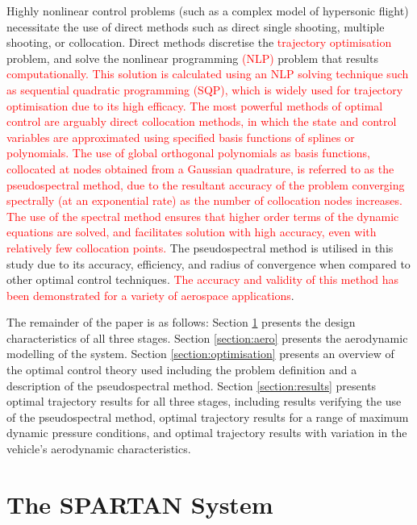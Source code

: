 \documentclass[journal]{new-aiaa}
\begin{document}
Highly nonlinear control problems (such as a complex model of hypersonic flight) necessitate the use of direct methods such as direct single shooting, multiple shooting, or collocation\cite{Rao2009}.
Direct methods discretise the \textcolor{red}{trajectory optimisation }problem, and solve the nonlinear programming \textcolor{red}{(NLP)} problem that results \textcolor{red}{computationally\cite{Fahroo2000,Stryk1992}. This solution is calculated using an NLP solving technique such as sequential quadratic programming (SQP), which is widely used for trajectory optimisation due to its high efficacy\cite{Rao2009,Boggs2000}. The most powerful methods of optimal control are arguably direct collocation methods, in which the state and control variables are approximated using specified basis functions of splines or polynomials\cite{Rao2009,Fahroo2000,Elganar}. The use of global orthogonal polynomials as basis functions, collocated at nodes obtained from a Gaussian quadrature, is referred to as the pseudospectral method, due to the resultant accuracy of the problem converging spectrally (at an exponential rate) as the number of collocation nodes increases\cite{Rao2009,Garg2009}. The use of the spectral method ensures that higher order terms of the dynamic equations are solved, and facilitates solution with high accuracy, even with relatively few collocation points\cite{Fahroo1999}.}
The pseudospectral method is utilised in this study due to its accuracy, efficiency, and radius of convergence when compared to other optimal control techniques\cite{Fahroo2000,Elganar}. \textcolor{red}{The accuracy and validity of this method has been demonstrated for a variety of aerospace applications\cite{Bedrossian,Huntington2008,Josselyn2002,Yan2007}}. 


The remainder of the paper is as follows: Section \ref{section:system} presents the design characteristics of all three stages. Section \ref{section:aero} presents the aerodynamic modelling of the system. Section \ref{section:optimisation} presents an overview of the optimal control theory used including the problem definition and a description of the pseudospectral method. Section \ref{section:results} presents optimal trajectory results for all three stages, including results verifying the use of the pseudospectral method, optimal trajectory results for a range of maximum dynamic pressure conditions, and optimal trajectory results with variation in the vehicle's aerodynamic characteristics.

\section{The SPARTAN System} \label{section:system}
\end{document}
